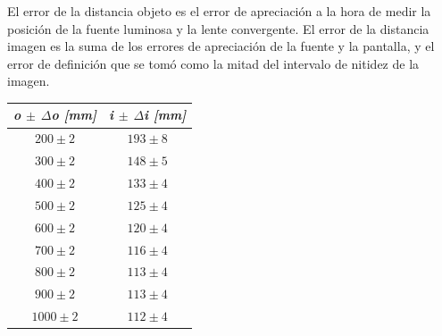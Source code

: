 \documentclass[a4paper,12pt]{article}
\newenvironment{Figure}
  {\par\medskip\noindent\minipage{\linewidth}}
  {\endminipage\par\medskip}
\begin{document}
\begin{multicols*}{2}
        El error de la distancia objeto es el error de apreciación a la hora de medir la posición de la fuente luminosa y la lente convergente. El error de la distancia imagen es la suma de los errores de apreciación de la fuente y la pantalla, y el error de definición que se tomó como la mitad del intervalo de nitidez de la imagen.

        \begin{Figure}
            \centering

            \begin{tabular}{cc}
                \toprule
                \textit{\textbf{o $\pm$ $\Delta$o [mm]}} & \textit{\textbf{i $\pm$ $\Delta$i [mm]}}\\
                \midrule
                $200 \pm 2$ & $193 \pm 8$ \\ 
                $300 \pm 2$ & $148 \pm 5$ \\ 
                $400 \pm 2$ & $133 \pm 4$ \\ 
                $500 \pm 2$ & $125 \pm 4$ \\ 
                $600 \pm 2$ & $120 \pm 4$ \\ 
                $700 \pm 2$ & $116 \pm 4$ \\ 
                $800 \pm 2$ & $113 \pm 4$ \\    
                $900 \pm 2$ & $113 \pm 4$ \\ 
                $1000 \pm 2$ & $112 \pm 4$ \\ 
                \bottomrule
            \end{tabular}

            \label{i vs o lc}
        \end{Figure}

        \begin{Figure}
            \centering


\end{Figure}
\end{multicols*}
\end{document}
